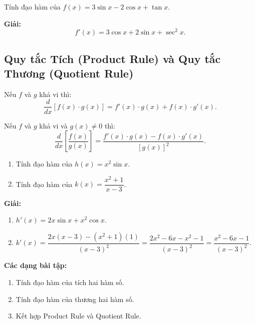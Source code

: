 \documentclass[12pt,a4paper]{article}
\begin{document}
\begin{vidu}
  Tính đạo hàm của $f(x) = 3\sin x - 2\cos x + \tan x$.

  \medskip\textbf{Giải:}
  \[
    f'(x) = 3\cos x + 2\sin x + \sec^2 x.
  \]
\end{vidu}

\subsection{Quy tắc Tích (Product Rule) và Quy tắc Thương (Quotient Rule)}

\begin{congthuc}[title={Quy tắc Tích (Product Rule)}]
  Nếu $f$ và $g$ khả vi thì:
  \[
    \dfrac{d}{dx}[f(x) \cdot g(x)] = f'(x) \cdot g(x) + f(x) \cdot g'(x).
  \]
\end{congthuc}

\begin{congthuc}[title={Quy tắc Thương (Quotient Rule)}]
  Nếu $f$ và $g$ khả vi và $g(x) \ne 0$ thì:
  \[
    \dfrac{d}{dx}\!\left[\dfrac{f(x)}{g(x)}\right] = \dfrac{f'(x) \cdot g(x) - f(x) \cdot g'(x)}{[g(x)]^2}.
  \]
\end{congthuc}

\begin{vidu}
  \begin{enumerate}[label=(\alph*)]
    \item Tính đạo hàm của $h(x) = x^2 \sin x$.
    \item Tính đạo hàm của $k(x) = \dfrac{x^2 + 1}{x - 3}$.
  \end{enumerate}

  \medskip\textbf{Giải:}
  \begin{enumerate}[label=(\alph*)]
    \item $h'(x) = 2x \sin x + x^2 \cos x$.
    \item $k'(x) = \dfrac{2x(x-3) - (x^2 + 1)(1)}{(x-3)^2} = \dfrac{2x^2 - 6x - x^2 - 1}{(x-3)^2} = \dfrac{x^2 - 6x - 1}{(x-3)^2}$.
  \end{enumerate}
\end{vidu}

\medskip\noindent\textbf{Các dạng bài tập:}
\begin{enumerate}[label=\textbf{Dạng \arabic*:}, leftmargin=*, align=left]
  \item Tính đạo hàm của tích hai hàm số.
  \item Tính đạo hàm của thương hai hàm số.
  \item Kết hợp Product Rule và Quotient Rule.
\end{enumerate}
\end{document}
